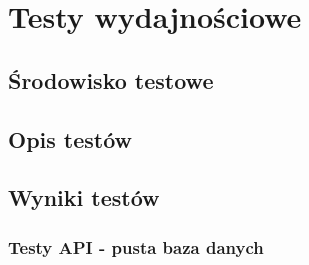 \chapter{Testy wydajnościowe}
\section{Środowisko testowe}
\section{Opis testów}
\section{Wyniki testów}

\subsection{Testy API - pusta baza danych}


% 
%
%
%
%
%
%
%
